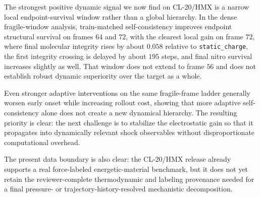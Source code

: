 The strongest positive dynamic signal we now find on CL-20/HMX is a narrow local endpoint-survival window rather than a global hierarchy. In the dense fragile-window analysis, train-matched self-consistency improves endpoint structural survival on frames $64$ and $72$, with the clearest local gain on frame $72$, where final molecular integrity rises by about $0.058$ relative to \texttt{static\_charge}, the first integrity crossing is delayed by about $195$ steps, and final nitro survival increases slightly as well. That window does not extend to frame $56$ and does not establish robust dynamic superiority over the target as a whole.

Even stronger adaptive interventions on the same fragile-frame ladder generally worsen early onset while increasing rollout cost, showing that more adaptive self-consistency alone does not create a new dynamical hierarchy. The resulting priority is clear: the next challenge is to stabilize the electrostatic gain so that it propagates into dynamically relevant shock observables without disproportionate computational overhead.

The present data boundary is also clear: the CL-20/HMX release already supports a real force-labeled energetic-material benchmark, but it does not yet retain the reviewer-complete thermodynamic and labeling provenance needed for a final pressure- or trajectory-history-resolved mechanistic decomposition.

